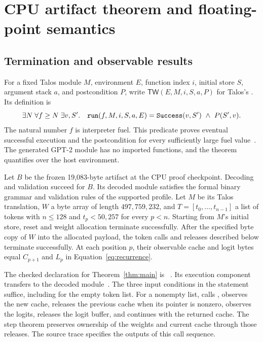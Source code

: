 \section{CPU artifact theorem and floating-point semantics}

\subsection{Termination and observable results}

For a fixed Talos module $M$, environment $E$, function index $i$, initial store $S$, argument stack $a$, and postcondition $P$, write $\mathsf{TW}(E,M,i,S,a,P)$ for Talos's .  Its definition is
\begin{equation}\label{eq:termination}
\exists N\;\forall f\geq N\;\exists v,S'.\quad
\texttt{run}(f,M,i,S,a,E)=\texttt{Success}(v,S')\ \land\ P(S',v).
\end{equation}
The natural number $f$ is interpreter fuel.  This predicate proves eventual successful execution and the postcondition for every sufficiently large fuel value~\cite{termination}.  The generated GPT-2 module has no imported functions, and the theorem quantifies over the host environment.

\begin{theorem}\label{thm:main}
Let $B$ be the frozen 19,083-byte artifact at the CPU proof checkpoint.  Decoding and validation succeed for $B$.  Its decoded module satisfies the formal binary grammar and validation rules of the supported profile.  Let $M$ be its Talos translation, $W$ a byte array of length $497{,}759{,}232$, and $T=[t_0,\ldots,t_{n-1}]$ a list of  tokens with $n\leq128$ and $t_p<50{,}257$ for every $p<n$.  Starting from $M$'s initial store, reset and weight allocation terminate successfully.  After the specified byte copy of $W$ into the allocated payload, the token calls and releases described below terminate successfully.  At each position $p$, their observable cache and logit bytes equal $C_{p+1}$ and $L_p$ in Equation~\eqref{eq:recurrence}.
\end{theorem}

The checked declaration for Theorem~\ref{thm:main} is ~\cite{artifact}.  Its execution component transfers  to the decoded module~\cite{session}.  The three input conditions in the statement suffice, including for the empty token list.  For a nonempty list,  calls , observes the new cache, releases the previous cache when its pointer is nonzero, observes the logits, releases the logit buffer, and continues with the returned cache.  The step theorem preserves ownership of the weights and current cache through those releases.  The source trace specifies the outputs of this call sequence.

